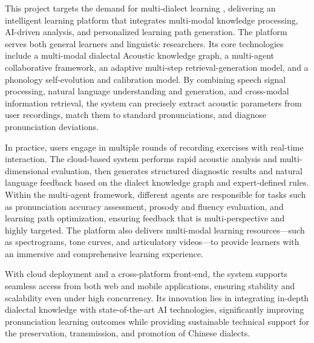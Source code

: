 \begin{abstract*}
This project targets the demand for multi-dialect learning , delivering an intelligent learning platform that integrates multi-modal knowledge processing, AI-driven analysis, and personalized learning path generation. The platform serves both general learners and linguistic researchers. Its core technologies include a multi-modal dialectal Acoustic knowledge graph, a multi-agent collaborative framework, an adaptive multi-step retrieval-generation model, and a phonology self-evolution and calibration model. By combining speech signal processing, natural language understanding and generation, and cross-modal information retrieval, the system can precisely extract acoustic parameters from user recordings, match them to standard pronunciations, and diagnose pronunciation deviations.

In practice, users engage in multiple rounds of recording exercises with real-time interaction. The cloud-based system performs rapid acoustic analysis and multi-dimensional evaluation, then generates structured diagnostic results and natural language feedback based on the dialect knowledge graph and expert-defined rules. Within the multi-agent framework, different agents are responsible for tasks such as pronunciation accuracy assessment, prosody and fluency evaluation, and learning path optimization, ensuring feedback that is multi-perspective and highly targeted. The platform also delivers multi-modal learning resources—such as spectrograms, tone curves, and articulatory videos—to provide learners with an immersive and comprehensive learning experience.

With cloud deployment and a cross-platform front-end, the system supports seamless access from both web and mobile applications, ensuring stability and scalability even under high concurrency. Its innovation lies in integrating in-depth dialectal knowledge with state-of-the-art AI technologies, significantly improving pronunciation learning outcomes while providing sustainable technical support for the preservation, transmission, and promotion of Chinese dialects.
\end{abstract*}
